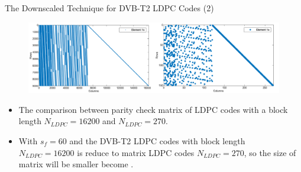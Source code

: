 \documentclass[11pt, aspectratio=169]{beamer}
\begin{document}
\begin{frame}{The Downscaled Technique for DVB-T2 LDPC Codes (2)}
\begin{figure}
\centering 
\includegraphics[scale=0.55]{gambarafa/compareH}

\label{sistemmodelMQCLDPC} %
\end{figure}
\begin{itemize}
\item The comparison between parity check matrix of LDPC codes with a block length $N_{LDPC} = 16200$ and $N_{LDPC} = 270$.

\item With $s_f=60$ and the DVB-T2 LDPC codes with block length $N_{LDPC}=16200$ is reduce to matrix LDPC codes $N_{LDPC}=270$, so the size of matrix will be smaller become .
\end{itemize}





\end{frame}
\end{document}
